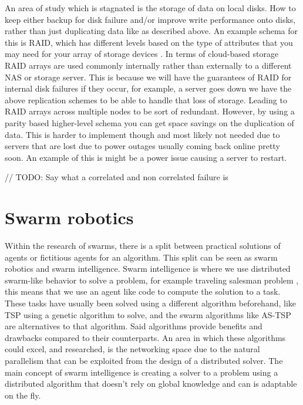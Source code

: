 \documentclass{UoYCSproject}
\begin{document}
An area of study which is stagnated is the storage of data on local disks. How to keep either backup for disk failure and/or improve write performance onto disks, rather than just duplicating data like as described above.
An example schema for this is RAID, which has different levels based on the type of attributes that you may need for your array of storage devices \cite{RAID Levels}.
In terms of cloud-based storage RAID arrays are used commonly internally rather than externally to a different NAS or storage server.
This is because we will have the guarantees of RAID for internal disk failures if they occur, for example, a server goes down we have the above replication schemes to be able to handle that loss of storage.
Leading to RAID arrays across multiple nodes to be sort of redundant.
However, by using a parity \cite{Raid parity} based higher-level schema you can get space savings on the duplication of data. This is harder to implement though and most likely not needed due to servers that are lost due to power outages usually coming back online pretty soon. An example of this is might be a power issue causing a server to restart.

// TODO: Say what a correlated and non correlated failure is

\section{Swarm robotics}
\label{sec:Robotics}

Within the research of swarms, there is a split between practical solutions of agents or fictitious agents for an algorithm. This split can be seen as swarm robotics and swarm intelligence.
Swarm intelligence is where we use distributed swarm-like behavior to solve a problem, for example traveling salesman problem \cite{Swarm intellegiegence}, this means that we use an agent like code to compute the solution to a task.
These tasks have usually been solved using a different algorithm beforehand, like TSP using a genetic algorithm to solve, and the swarm algorithms like AS-TSP \cite{Swarm intellegiegence} are alternatives to that algorithm.
Said algorithms provide benefits and drawbacks compared to their counterparts. An area in which these algorithms could excel, and researched, is the networking space due to the natural parallelism that can be exploited from the design of a distributed solver.
The main concept of swarm intelligence is creating a solver to a problem using a distributed algorithm that doesn't rely on global knowledge and can is adaptable on the fly.
\end{document}
